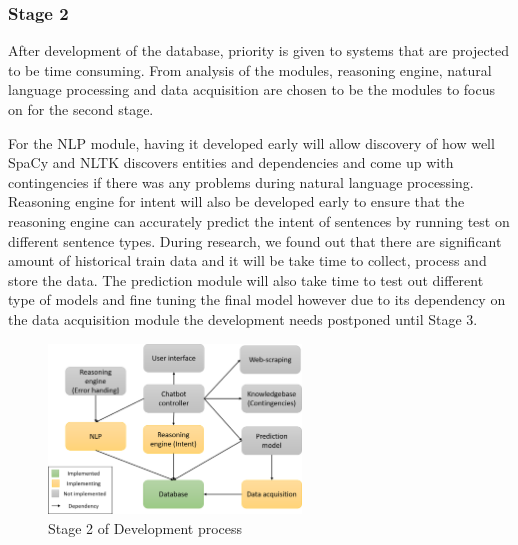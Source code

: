 \documentclass[11pt]{article}
\begin{document}
\subsubsection{Stage 2}
After development of the database, priority is given to systems that are projected to be time consuming. From analysis of the modules, reasoning engine, natural language processing and data acquisition are chosen to be the modules to focus on for the second stage. 

For the NLP module, having it developed early will allow discovery of how well SpaCy and NLTK discovers entities and dependencies and come up with contingencies if there was any problems during natural language processing. Reasoning engine for intent will also be developed early to ensure that the reasoning engine can accurately predict the intent of sentences by running test on different sentence types. During research, we found out that there are significant amount of historical train data and it will be take time to collect, process and store the data. The prediction module will also take time to test out different type of models and fine tuning the final model however due to its dependency on the data acquisition module the development needs postponed until Stage 3.
\begin{figure}[!htb]
	\centering
	\includegraphics[width=0.6\textwidth]{Stage_2}
	\caption{Stage 2 of Development process }\label{fig:Stage 2}
\end{figure}
\end{document}
